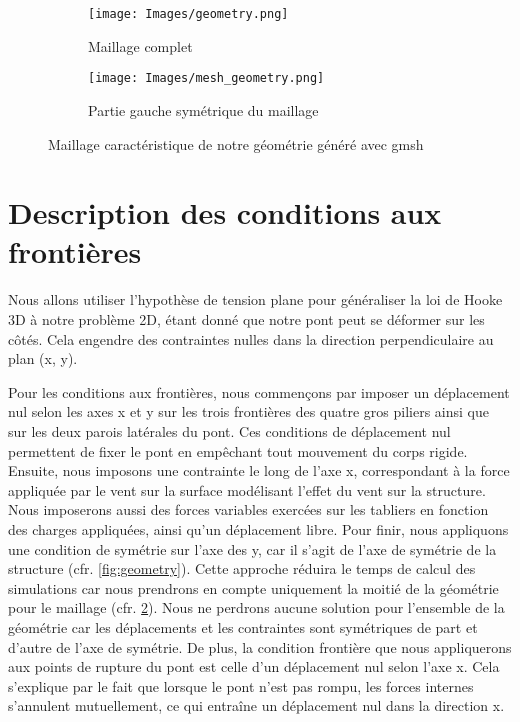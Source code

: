 \documentclass{article}
\begin{document}
\begin{figure}[H]
     \centering
     \hspace{0cm}
     \begin{subfigure}[b]{0.6\textwidth}
         \centering
         \texttt{[image: Images/geometry.png]}
         \caption{Maillage complet}
         \label{fig:meshAll}
     \end{subfigure}
     \hspace{0cm}
     \begin{subfigure}[b]{0.3\textwidth}
         \centering
         \texttt{[image: Images/mesh\_geometry.png]}
         \caption{Partie gauche symétrique du maillage}
         \label{fig:meshLeft}
     \end{subfigure}
     
        \caption{Maillage caractéristique de notre géométrie généré avec gmsh}
        \label{fig:mesh_gmsh}
\end{figure}


\section{Description des conditions aux frontières}

Nous allons utiliser l'hypothèse de tension plane pour généraliser la loi de Hooke 3D à notre problème 2D, étant donné que notre pont peut se déformer sur les côtés. Cela engendre des contraintes nulles dans la direction perpendiculaire au plan (x, y).

Pour les conditions aux frontières, nous commençons par imposer un déplacement nul selon les axes x et y sur les trois frontières des quatre gros piliers ainsi que sur les deux parois latérales du pont. Ces conditions de déplacement nul permettent de fixer le pont en empêchant tout mouvement du corps rigide.
Ensuite, nous imposons une contrainte le long de l'axe x, correspondant à la force appliquée par le vent sur la surface modélisant l'effet du vent sur la structure.
Nous imposerons aussi des forces variables exercées sur les tabliers en fonction des charges appliquées, ainsi qu'un déplacement libre.
Pour finir, nous appliquons une condition de symétrie sur l'axe des y, car il s'agit de l'axe de symétrie de la structure (cfr. \ref{fig:geometry}). Cette approche réduira le temps de calcul des simulations car nous prendrons en compte uniquement la moitié de la géométrie pour le maillage (cfr. \ref{fig:meshLeft}). Nous ne perdrons aucune solution pour l'ensemble de la géométrie car les déplacements et les contraintes sont symétriques de part et d'autre de l'axe de symétrie. De plus, la condition frontière que nous appliquerons aux points de rupture du pont est celle d'un déplacement nul selon l'axe x. Cela s'explique par le fait que lorsque le pont n'est pas rompu, les forces internes s'annulent mutuellement, ce qui entraîne un déplacement nul dans la direction x.
\end{document}
